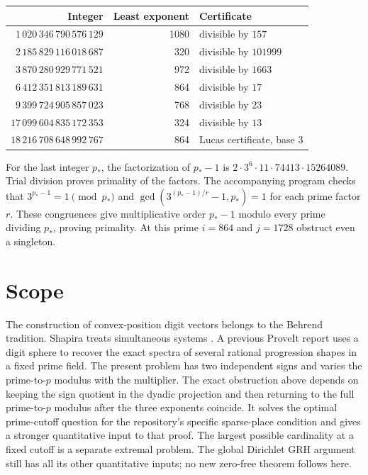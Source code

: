 \documentclass[11pt]{article}
\begin{document}
\begin{center}
\begin{tabular}{rrl}
\toprule
Integer & Least exponent & Certificate\\
\midrule
$1\,020\,346\,790\,576\,129$ &1080& divisible by $157$\\
$2\,185\,829\,116\,018\,687$ &320& divisible by $101999$\\
$3\,870\,280\,929\,771\,521$ &972& divisible by $1663$\\
$6\,412\,351\,813\,189\,631$ &864& divisible by $17$\\
$9\,399\,724\,905\,857\,023$ &768& divisible by $23$\\
$17\,099\,604\,835\,172\,353$ &324& divisible by $13$\\
$18\,216\,708\,648\,992\,767$ &864& Lucas certificate, base $3$\\
\bottomrule
\end{tabular}
\end{center}

For the last integer $p_*$, the factorization of $p_*-1$ is
$2\cdot3^6\cdot11\cdot74413\cdot15264089$. Trial division proves primality
of the factors. The accompanying program checks that $3^{p_*-1}=1\pmod{p_*}$
and $\gcd(3^{(p_*-1)/r}-1,p_*)=1$ for each prime factor $r$.
These congruences give multiplicative order $p_*-1$ modulo every prime
dividing $p_*$, proving primality. At this prime $i=864$ and $j=1728$
obstruct even a singleton.

\section{Scope}

The construction of convex-position digit vectors belongs to the Behrend
tradition. Shapira treats simultaneous systems \cite{shapira}. A previous
ProveIt report \cite{previous} uses a digit sphere to recover the exact spectra
of several rational progression shapes in a fixed prime field. The present
problem has two independent signs and varies the prime-to-$p$ modulus with
the multiplier. The exact obstruction above depends on keeping the
sign quotient in the dyadic projection and then returning to the full
prime-to-$p$ modulus after the three exponents coincide. It solves the
optimal prime-cutoff question for the repository's specific sparse-place
condition and gives a stronger quantitative input to that proof. The largest
possible cardinality at a fixed cutoff is a separate extremal problem.
The global Dirichlet GRH argument still has all its other quantitative
inputs; no new zero-free theorem follows here.
\end{document}
